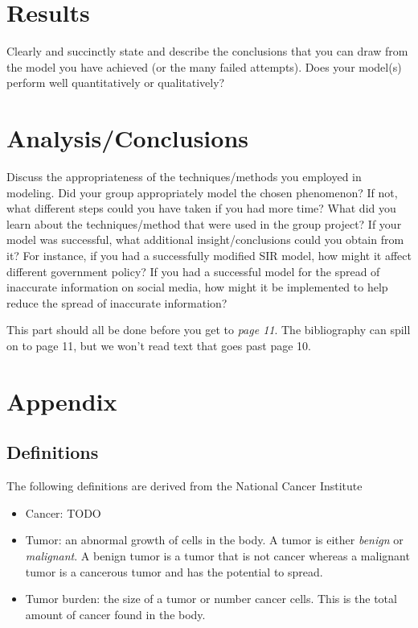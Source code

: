 \documentclass[11pt]{amsart}
\begin{document}
\section{Results}

Clearly and succinctly state and describe the conclusions that you can draw from the model you have achieved (or the many failed attempts). Does your model(s) perform well quantitatively or qualitatively?

\section{Analysis/Conclusions}

Discuss the appropriateness of the techniques/methods you employed in modeling. Did your group appropriately model the chosen phenomenon? If not, what different steps could you have taken if you had more time? What did you learn about the techniques/method that were used in the group project? If your model was successful, what additional insight/conclusions could you obtain from it? For instance, if you had a successfully modified SIR model, how might it affect different government policy? If you had a successful model for the spread of inaccurate information on social media, how might it be implemented to help reduce the spread of inaccurate information?



This part should all be done before you get to \emph{page 11}.  The bibliography can spill on to page 11, but we won't read text that goes past page 10.

\section*{Appendix}

\subsection*{Definitions}
The following definitions are derived from the National Cancer Institute
\begin{itemize}
	\item Cancer:  TODO
	\item Tumor: an abnormal growth of cells in the body. A tumor is either \textit{benign} or \textit{malignant}. A benign tumor is a tumor that is not cancer whereas a malignant tumor is a cancerous tumor and has the potential to spread.
	\item Tumor burden: the size of a tumor or number cancer cells. This is the total amount of cancer found in the body. 

\end{itemize}
\end{document}
